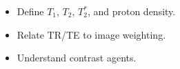 \begin{objectives}
\begin{itemize}[leftmargin=1.4em,itemsep=2pt]
\item Define $T_1$, $T_2$, $T_2^{*}$, and proton density.
\item Relate TR/TE to image weighting.
\item Understand contrast agents.
\end{itemize}
\end{objectives}
